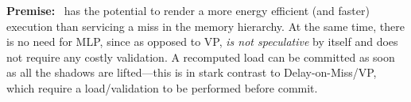 {\noindent \bf Premise:}
\recomp\ has the potential to render a more energy efficient (and faster) execution than servicing a miss in the memory hierarchy. At the same time, there is no need for MLP, since as opposed to VP, \emph{\recomp{} is not speculative} by itself and does not require any costly validation. 
A recomputed load can be committed as soon as all the shadows are lifted---this is in stark contrast to Delay-on-Miss/VP, which require a load/validation to be performed before commit.